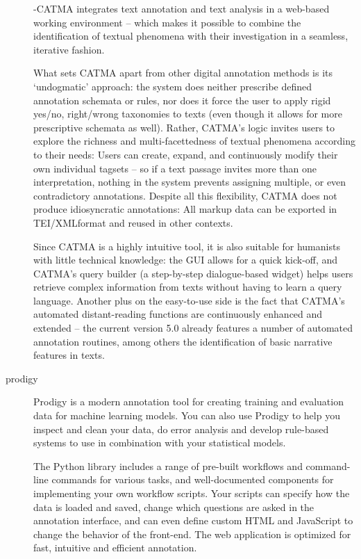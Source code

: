 \begin{description}
    -CATMA integrates text annotation and text analysis in a web-based working	 environment	 – which
    makes	it	possible	to	combine	the	identification	of	textual	phenomena with their investigation in a seamless,
    iterative fashion.

    What	sets	CATMA	apart	from	other	digital	annotation	methods	is	its	‘undogmatic’	approach:	the	system
    does	 neither	 prescribe	 defined	 annotation	 schemata
    or	 rules,	 nor	 does	 it	 force	 the	 user	 to	 apply	 rigid
    yes/no,	right/wrong	taxonomies	to	texts	(even	though
    it	allows	for	more	prescriptive	schemata	as	well).	Rather,	CATMA’s	logic	invites	users	 to	explore	the	richness	and	multi-facettedness	of	textual	phenomena	according	to	their	needs:	Users	can	create,	expand,	and
    continuously	modify	their	own	individual	tagsets	– so
    if	a	text	passage	invites	more	than	one	interpretation,
    nothing	in	the	system	prevents	assigning	multiple,	or
    even	contradictory	annotations.	Despite	all	this	 flexibility,	CATMA	does	not	produce	idiosyncratic	annotations:	All	markup	 data	 can	 be	 exported	in	 TEI/XMLformat	and	reused	in	other	contexts.

    Since	CATMA	is	a	highly	intuitive	tool,	it	is	also	suitable	for	humanists	with	little	technical	knowledge:	the
    GUI	 allows	 for	 a	 quick	 kick-off,	 and	 CATMA’s	 query
    builder	(a	step-by-step	dialogue-based	widget)	helps
    users	retrieve	complex	information	from	texts	without
    having	to	learn	a	query	language.	Another	plus	on	the
    easy-to-use	 side	is	 the	 fact	 that	 CATMA’s	 automated
    distant-reading	 functions	are	 continuously	enhanced
    and	 extended	 – the	 current	 version	 5.0	 already	 features	 a	 number	 of	 automated	 annotation	 routines,
    among	others	the	identification	of	basic	narrative	features	in	texts.

    \item[prodigy]

    Prodigy is a modern annotation tool for creating training and evaluation data for machine learning models. You can also use Prodigy to help you inspect and clean your data, do error analysis and develop rule-based systems to use in combination with your statistical models.

    The Python library includes a range of pre-built workflows and command-line commands for various tasks, and well-documented components for implementing your own workflow scripts. Your scripts can specify how the data is loaded and saved, change which questions are asked in the annotation interface, and can even define custom HTML and JavaScript to change the behavior of the front-end. The web application is optimized for fast, intuitive and efficient annotation.


\end{description}

